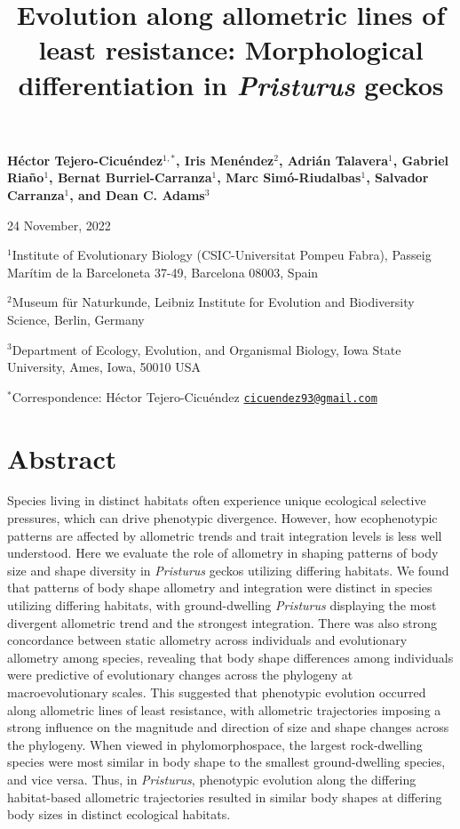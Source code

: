 \documentclass[
  11pt,
]{article}
\title{Evolution along allometric lines of least resistance:
Morphological differentiation in \emph{Pristurus} geckos}
\author{}
\date{\vspace{-2.5em}}
\begin{document}
\maketitle

\begin{center}
\textbf{H{\'{e}}ctor Tejero-Cicu{\'{e}}ndez$^{1,*}$,  Iris Men{\'{e}}ndez$^{2}$, Adri{\'{a}}n Talavera$^{1}$, Gabriel Riaño$^{1}$, Bernat Burriel-Carranza$^{1}$, Marc Sim{\'{o}}-Riudalbas$^{1}$, Salvador Carranza$^{1}$, and Dean C. Adams$^{3}$}
\end{center}

\begin{center}24 November, 2022\end{center}

\(^{1}\)Institute of Evolutionary Biology (CSIC-Universitat Pompeu
Fabra), Passeig Marítim de la Barceloneta 37-49, Barcelona 08003, Spain

\(^{2}\)Museum für Naturkunde, Leibniz Institute for Evolution and
Biodiversity Science, Berlin, Germany

\(^{3}\)Department of Ecology, Evolution, and Organismal Biology, Iowa
State University, Ames, Iowa, 50010 USA

\(^{*}\)Correspondence: Héctor Tejero-Cicuéndez
\href{mailto:cicuendez93@gmail.com}{\nolinkurl{cicuendez93@gmail.com}}

\newpage

\hypertarget{abstract}{%
\section{Abstract}\label{abstract}}

Species living in distinct habitats often experience unique ecological
selective pressures, which can drive phenotypic divergence. However, how
ecophenotypic patterns are affected by allometric trends and trait
integration levels is less well understood. Here we evaluate the role of
allometry in shaping patterns of body size and shape diversity in
\emph{Pristurus} geckos utilizing differing habitats. We found that
patterns of body shape allometry and integration were distinct in
species utilizing differing habitats, with ground-dwelling
\emph{Pristurus} displaying the most divergent allometric trend and the
strongest integration. There was also strong concordance between static
allometry across individuals and evolutionary allometry among species,
revealing that body shape differences among individuals were predictive
of evolutionary changes across the phylogeny at macroevolutionary
scales. This suggested that phenotypic evolution occurred along
allometric lines of least resistance, with allometric trajectories
imposing a strong influence on the magnitude and direction of size and
shape changes across the phylogeny. When viewed in phylomorphospace, the
largest rock-dwelling species were most similar in body shape to the
smallest ground-dwelling species, and vice versa. Thus, in
\emph{Pristurus}, phenotypic evolution along the differing habitat-based
allometric trajectories resulted in similar body shapes at differing
body sizes in distinct ecological habitats.
\end{document}

